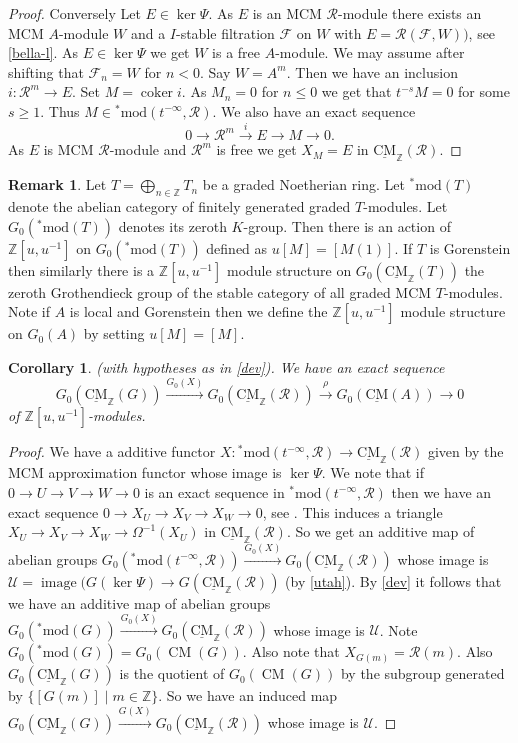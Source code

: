 \documentclass{amsart}
\newcommand{\Z}{\mathbb{Z} }
\newcommand{\eR}{\mathcal{R} }
\newcommand{\Fc}{\mathcal{F} }
\newcommand{\rt}{\rightarrow}
\newcommand{\image}{\operatorname{image}}
\newcommand{\coker}{\operatorname{coker}}
\newcommand{\CMS}{\operatorname{\underline{CM}}}
\newcommand{\CMa}{\operatorname{CM}}
\newcommand{\smod}{\operatorname{^*mod}}
\theoremstyle{plain}
\newtheorem{corollary}[theorem]{Corollary}
\theoremstyle{definition}
\newtheorem{remark}[theorem]{Remark}
\theoremstyle{remark}
\begin{document}
{\begin{proof}
 Conversely Let $E \in \ker \Psi$. As $E$ is an MCM $\eR$-module  there exists an  MCM $A$-module $W$ and a $I$-stable filtration $\Fc$ on $W$  with $E = \eR( \Fc, W))$, see \ref{bella-l}. As $E \in \ker \Psi$ we get $W$ is a free $A$-module. We may assume after shifting that $\Fc_n = W$ for $n <0$. Say $W = A^m$. Then we have an inclusion $i\colon \eR^m \rt E$. Set $ M = \coker i$. As $M_n = 0$ for $n \leq 0$ we get that $t^{-s}M = 0$ for some $s \geq 1$. Thus $M \in \smod(t^{-\infty}, \eR)$. We also have an exact sequence
 $$0 \rt \eR^m \xrightarrow{i} E \rt M \rt 0.$$
 As $E$ is MCM $\eR$-module and $\eR^m$ is free we get $X_M = E$ in $\CMS_\Z(\eR)$.
\end{proof}

\begin{remark}
Let $T = \bigoplus_{n \in \Z}T_n$ be a graded Noetherian ring. Let $\smod(T)$ denote the abelian category of finitely generated graded $T$-modules. Let $G_0(\smod(T))$ denotes its zeroth $K$-group.
Then there is an action of $\Z[u,u^{-1}]$ on $G_0(\smod(T))$  defined as $u [M] = [M(1)]$. If $T$ is Gorenstein then similarly there is a $\Z[u,u^{-1}]$ module structure on $G_0(\CMS_\Z(T))$ the  zeroth Grothendieck group of the stable category of all graded MCM $T$-modules. Note if $A$ is local and Gorenstein  then we define the $\Z[u,u^{-1}]$ module structure on $G_0(A)$ by setting $u[M] = [M]$.
\end{remark}
\begin{corollary}
\label{bhut}
(with hypotheses as in \ref{dev}). We have an exact sequence $$G_0(\CMS_\Z(G)) \xrightarrow{G_0(X)} G_0(\CMS_\Z(\eR)) \xrightarrow{\rho} G_0(\CMS(A)) \rt 0$$ of $\Z[u,u^{-1}]$-modules.
\end{corollary}
\begin{proof}
  We have a additive functor $X \colon \smod(t^{-\infty}, \eR) \rt \CMS_\Z(\eR)$ given by the MCM approximation functor whose image is $\ker \Psi$. We note that if $0 \rt U \rt V \rt W \rt 0$ is an exact sequence in $\smod(t^{-\infty}, \eR)$ then we have an exact sequence $0 \rt X_{U} \rt  X_V \rt X_W \rt 0$, see \cite[1.4]{KK}. This induces a triangle $X_{U} \rt X_V \rt X_W \rt \Omega^{-1}(X_U)$ in $\CMS_\Z(\eR)$.  So we get an additive map of abelian groups
  $G_0(\smod(t^{-\infty}, \eR)) \xrightarrow{G_0(X)} G_0(\CMS_\Z(\eR))$ whose image is $\mathcal{U} =\image (G(\ker \Psi) \rt G(\CMS_\Z(\eR))$ (by \ref{utah}).
  By \ref{dev} it follows that we have an additive map of abelian groups
  $G_0(\smod(G)) \xrightarrow{G_0(X)} G_0(\CMS_\Z(\eR))$ whose image is $\mathcal{U}$. Note $G_0(\smod(G)) = G_0(\CMa(G))$. Also note that $X_{G(m)} = \eR(m)$. Also $G_0(\CMS_\Z(G)) $ is the quotient of $G_0(\CMa(G))$ by the subgroup generated by $\{ [G(m)] \mid m \in \Z \}$. So we have an induced map $G_0(\CMS_\Z(G)) \xrightarrow{G(X)} G_0(\CMS_\Z(\eR))$ whose image is $\mathcal{U}$.


\end{proof}}
\end{document}
